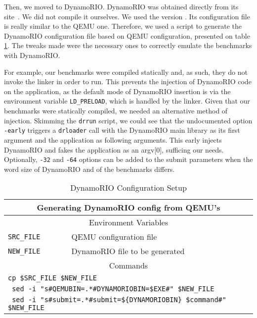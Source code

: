 \documentclass[11pt,twoside]{article}
\begin{document}
%
  Then, we moved to DynamoRIO. DynamoRIO was obtained
  directly from its site~\cite{dynsrc}. We did not compile it
  ourselves. We used the version \dynamorioversion.
  Its configuration file
  is really similar to the QEMU one. Therefore, we used a script
  to generate the DynamoRIO configuration file based on QEMU
  configuration, presented on table \ref{tab:dynconfig}.
  The tweaks made were the necessary ones to correctly
  emulate the benchmarks with DynamoRIO.

  For example, our benchmarks were compiled statically and,
  as such,
  they do not invoke the linker in order to run. This prevents
  the injection of DynamoRIO code on the application, as the
  default mode of DynamoRIO insertion is via the environment
  variable {\tt LD\_PRELOAD}, which is handled by the linker.
  Given that our benchmarks were statically compiled, we needed
  an alternative method of injection. Skimming the {\tt drrun}
  script, we could see that the undocumented option {\tt -early}
  triggers a {\tt drloader} call with the DynamoRIO main library
  as its first argument and the application as following arguments.
  This early injects DynamoRIO and fakes the application as an 
  argv[0], sufficing our needs.
  Optionally, {\tt -32} and {\tt -64} options can be added
  to the submit parameters when
  the word size of DynamoRIO and of the benchmarks differs.
  \begin{table}
  	  \begin{footnotesize}
	  \centering
	  \begin{tabular}{|l|l|}
	  \hline
	  \multicolumn{2}{|c|}{\bf %
	  	Generating DynamoRIO config from QEMU's} \\
	  \hline
	  \multicolumn{2}{|c|}{Environment Variables} \\
	  \hline
	  {\tt SRC\_FILE} & QEMU configuration file \\
	  {\tt NEW\_FILE} & DynamoRIO file to be generated \\
	  \hline
	  \multicolumn{2}{|c|}{Commands} \\
	  \hline
	  \multicolumn{2}{|l|}{\tt cp \$SRC\_FILE \$NEW\_FILE} \\
	  \multicolumn{2}{|l|}{\tt
					sed -i "s\#QEMUBIN=.*\#DYNAMORIOBIN=\$EXE\#"
						\$NEW\_FILE
		} \\
	  \multicolumn{2}{|l|}{\tt
					sed -i "s\#submit=.*\#submit=\$\{DYNAMORIOBIN\}
						 \$command\#" \$NEW\_FILE
		} \\
	  \hline
	  \end{tabular}
	  \caption{DynamoRIO Configuration Setup}
	  \label{tab:dynconfig}
	  \end{footnotesize}
  \end{table}
  
\end{document}

